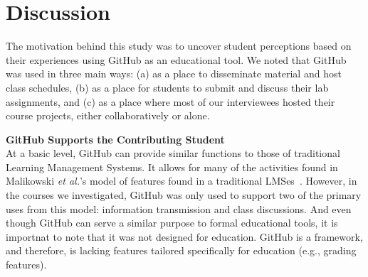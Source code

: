 \section{Discussion}
The motivation behind this study was to uncover student perceptions based on their experiences using GitHub as an educational tool. We noted that GitHub was used in three main ways: (a) as a place to disseminate material and host class schedules, (b) as a place for students to submit and discuss their lab assignments, and (c) as a place where most of our interviewees hosted their course projects, either collaboratively or alone.




\textbf{GitHub Supports the Contributing Student} \\
At a basic level, GitHub can provide similar functions to those of traditional Learning Management Systems. It allows for many of the activities found in Malikowski \textit{et al.}'s model of features found in a traditional LMSes~\cite{malikowski2007model}. However, in the courses we investigated, GitHub was only used to support two of the primary uses from this model: information transmission and class discussions. And even though GitHub can serve a similar purpose to formal educational tools, it is importnat to note that it was not designed for education. GitHub is a framework, and therefore, is lacking features tailored specifically for education (e.g., grading features).

